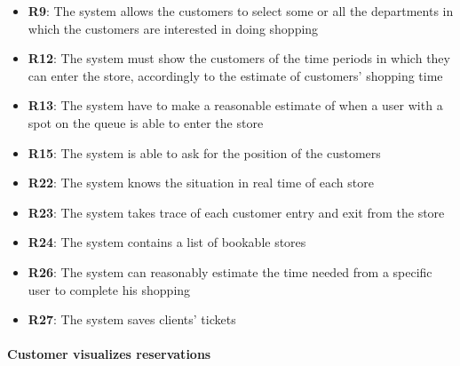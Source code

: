 \documentclass{article}
\begin{document}
\begin{center}
\begin{itemize}
					\item {\bfseries R9}: The system allows the customers to select some or all the departments in which the customers are interested in doing shopping
					\item {\bfseries R12}: The system must show the customers of the time periods in which they can
					enter the store, accordingly to the estimate of customers' shopping time
					\item {\bfseries R13}: The system have to make a reasonable estimate of when a user with a spot on the queue is able to enter the store
					\item {\bfseries R15}: The system is able to ask for the position of the customers
					\item {\bfseries R22}: The system knows the situation in real time of each store
					\item {\bfseries R23}: The system takes trace of each customer entry and exit from the store
					\item {\bfseries R24}: The system contains a list of bookable stores
					\item {\bfseries R26}: The system can reasonably estimate the time needed from a specific user to complete his shopping
					\item {\bfseries R27}: The system saves clients' tickets


					\end{itemize}
				\end{center}
			
			\paragraph{Customer visualizes reservations}
			
\end{document}
